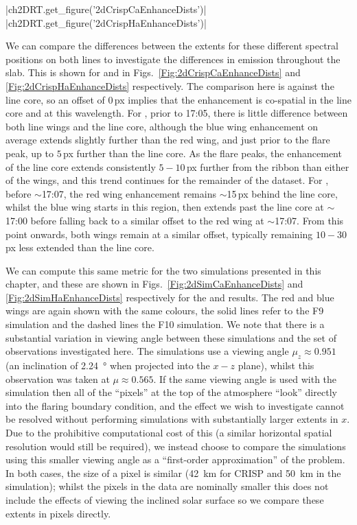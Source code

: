 \py[2DRT]|ch2DRT.get_figure('2dCrispCaEnhanceDists')|
\py[2DRT]|ch2DRT.get_figure('2dCrispHaEnhanceDists')|

We can compare the differences between the extents for these different spectral positions on both lines to investigate the differences in emission throughout the slab.
This is shown for \CaLine{} and \Ha{} in Figs.~\ref{Fig:2dCrispCaEnhanceDists} and \ref{Fig:2dCrispHaEnhanceDists} respectively.
The comparison here is against the line core, so an offset of $0$\,{}px implies that the enhancement is co-spatial in the line core and at this wavelength.
For \CaLine{}, prior to 17:05, there is little difference between both line wings and the line core, although the blue wing enhancement on average extends slightly further than the red wing, and just prior to the flare peak, up to $5$\,{}px further than the line core.
As the flare peaks, the enhancement of the line core extends consistently $5-10$\,{}px further from the ribbon than either of the wings, and this trend continues for the remainder of the dataset.
For \Ha{}, before $\sim$17:07, the red wing enhancement remains $\sim$15\,{}px behind the line core, whilst the blue wing starts in this region, then extends past the line core at $\sim$17:00 before falling back to a similar offset to the red wing at $\sim$17:07.
From this point onwards, both wings remain at a similar offset, typically remaining $10-30$\,{}px less extended than the line core.

We can compute this same metric for the two simulations presented in this chapter, and these are shown in Figs.~\ref{Fig:2dSimCaEnhanceDists} and \ref{Fig:2dSimHaEnhanceDists} respectively for the \CaLine{} and \Ha{} results.
The red and blue wings are again shown with the same colours, the solid lines refer to the F9 simulation and the dashed lines the F10 simulation.
We note that there is a substantial variation in viewing angle between these simulations and the set of observations investigated here.
The simulations use a viewing angle $\mu_z\approx0.951$ (an inclination of \SI{2.24}{\degree} when projected into the $x-z$ plane), whilst this observation was taken at $\mu\approx0.565$.
If the same viewing angle is used with the simulation then all of the ``pixels'' at the top of the atmosphere ``look'' directly into the flaring boundary condition, and the effect we wish to investigate cannot be resolved without performing simulations with substantially larger extents in $x$.
Due to the prohibitive computational cost of this (a similar horizontal spatial resolution would still be required), we instead choose to compare the simulations using this smaller viewing angle as a ``first-order approximation'' of the problem.
In both cases, the size of a pixel is similar (\SI{42}{\kilo\metre} for CRISP and \SI{50}{\kilo\metre} in the simulation); whilst the pixels in the data are nominally smaller this does not include the effects of viewing the inclined solar surface so we compare these extents in pixels directly.

